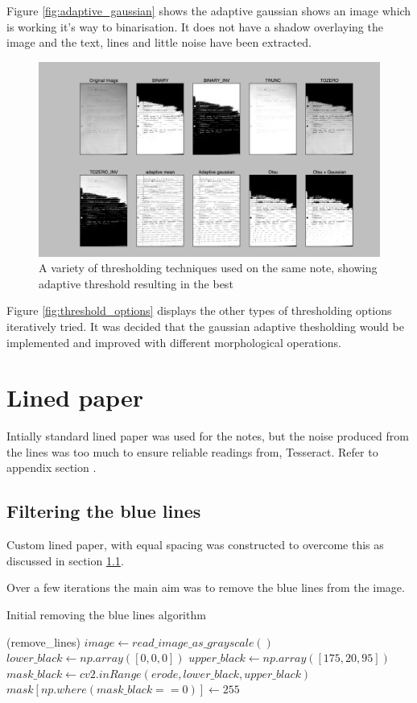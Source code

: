Figure \ref{fig:adaptive_gaussian} shows the adaptive gaussian shows an image which is working it's way to binarisation. It does not have a shadow overlaying the image and the text, lines and little noise have been extracted.

\begin{figure}[H]
  \centering
  \includegraphics{images/thresholding_options}
  \caption{A variety of thresholding techniques used on the same note, showing adaptive threshold resulting in the best}
  \label{fig:thresholding_options}
\end{figure}

Figure \ref{fig:threshold_options} displays the other types of thresholding options iteratively tried. It was decided that the gaussian adaptive thesholding would be implemented and improved with different morphological operations.

\section{Lined paper}
Intially standard lined paper was used for the notes, but the noise produced from the lines was too much to ensure reliable readings from, Tesseract. Refer to appendix \cite{appendix:image_processing} section \cite{processing:pre-line}.

\subsection{Filtering the blue lines}
Custom lined paper, with equal spacing was constructed to overcome this as discussed in section \ref{}.

Over a few iterations the main aim was to remove the blue lines from the image.
\begin{algorithm}
\caption{Initial removing the blue lines algorithm}
\label{algorithm:threshold1}
\begin{algorithmic}[1]
  \Function(remove\_lines)
    \State $image \gets read\_image\_as\_grayscale()$
    \State $lower\_black \gets np.array([0,0,0])$
    \State $upper\_black \gets np.array([175,20, 95])$
    \State $mask\_black \gets cv2.inRange(erode, lower\_black, upper\_black)$
    \State $mask[np.where(mask\_black == 0)] \gets 255$
  \EndFunction
  \end{algorithmic}
\end{algorithm}

